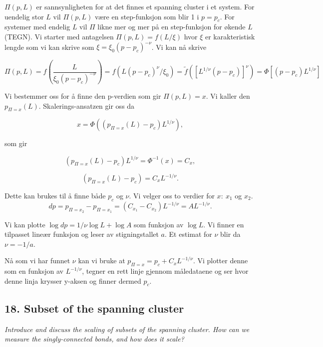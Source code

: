 \documentclass[a4paper,10pt]{article}
\begin{document}
$\Pi(p, L)$ er sannsynligheten for at det finnes et spanning cluster i et system. For uendelig stor $L$ vil $\Pi(p,L)$ være en step-funksjon som blir 1 i $p = p_c$. For systemer med endelig $L$ vil $\Pi$ likne mer og mer på en step-funksjon for økende $L$ (TEGN). Vi starter med antagelsen $\Pi(p,L) =f(L/\xi)$ hvor $\xi$ er karakteristisk lengde som vi kan skrive som $\xi=\xi_0(p-p_c)^{-\nu}$. Vi kan nå skrive

\begin{equation}
 \Pi(p,L) = f(\frac{L}{\xi_0(p-p_c)^{-\nu}}) = f(L(p-p_c)^{\nu}/\xi_0) = \tilde{f}([L^{1/\nu}(p-p_c)]^{\nu}) = \Phi[(p-p_c)L^{1/\nu}]
\end{equation}


Vi bestemmer oss for å finne den p-verdien som gir $\Pi(p, L) = x$. Vi kaller den $p_{\Pi=x}(L)$. Skalerings-ansatzen gir oss da 

\begin{equation}
 x = \Phi((p_{\Pi=x}(L)-p_c)L^{1/\nu}),
\end{equation}

som gir 

\begin{equation}
 (p_{\Pi=x}(L)-p_c)L^{1/\nu} = \Phi^{-1}(x) = C_x,
\end{equation}

\begin{equation}
  (p_{\Pi=x}(L)-p_c)=C_x L^{-1/\nu}.
\end{equation}

Dette kan brukes til å finne både $p_c$ og $\nu$.
Vi velger oss to verdier for $x:\ x_1$ og $x_2$. 
\begin{equation}
 dp = p_{\Pi=x_2} - p_{\Pi=x_1} = (C_{x_1} - C_{x_2})L^{-1/\nu} = AL^{-1/\nu}.
\end{equation}

Vi kan plotte $\log d p = 1/\nu \log L + \log A$ som funksjon av $\log L$. Vi finner en tilpasset lineær funksjon og leser av stigningstallet $a$. Et estimat for  $\nu$ blir da $\nu = -1/a$.

Nå som vi har funnet $\nu$ kan vi bruke at $p_{\Pi=x} = p_c + C_x L^{-1/\nu}$. Vi plotter denne som en funksjon av $L^{-1/\nu}$, tegner en rett linje gjennom måledataene og ser hvor denne linja krysser y-aksen og finner dermed $p_c$.





\subsection*{18. Subset of the spanning cluster}
\textit{Introduce and discuss the scaling of subsets of the spanning cluster. How can
we measure the singly-connected bonds, and how does it scale?}
\end{document}
